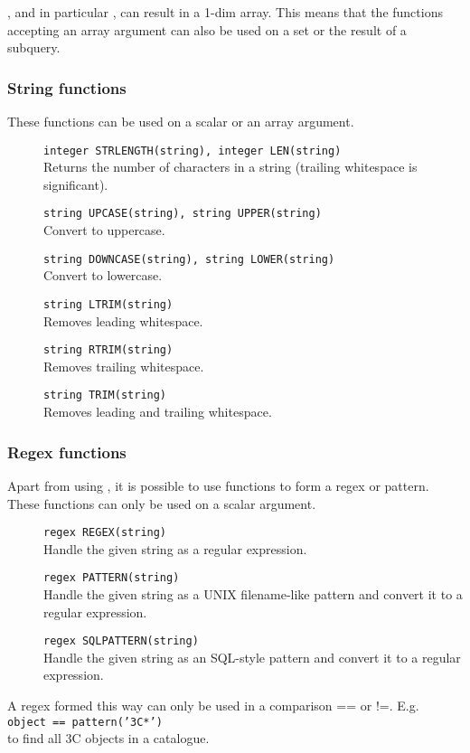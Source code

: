 , and in particular
, can result in a 1-dim array.
This means that the functions accepting an array argument can also
be used on a set or the result of a subquery.

\subsubsection{String functions}
These functions can be used on a scalar or an array argument.
\begin{description}
  \item[] \texttt{integer STRLENGTH(string),  integer LEN(string)}\\
       Returns the number of characters in a string
       (trailing whitespace is significant).
  \item[] \texttt{string UPCASE(string), string UPPER(string) }\\
        Convert to uppercase.
  \item[] \texttt{string DOWNCASE(string),  string LOWER(string)}\\
        Convert to lowercase.
  \item[] \texttt{string LTRIM(string)}\\
       Removes leading whitespace.
  \item[] \texttt{string RTRIM(string)}\\
       Removes trailing whitespace.
  \item[] \texttt{string TRIM(string)}\\
       Removes leading and trailing whitespace.
\end{description}

\subsubsection{Regex functions}
Apart from using ,
it is possible to use functions to form a regex or pattern.
These functions can only be used on a scalar argument.

\begin{description}
  \item[] \texttt{regex REGEX(string)}\\
       Handle the given string as a regular expression.
  \item[] \texttt{regex PATTERN(string)}\\
       Handle the given string as a UNIX filename-like pattern and
       convert it to a regular expression.
  \item[] \texttt{regex SQLPATTERN(string)}\\
       Handle the given string as an SQL-style pattern and
       convert it to a regular expression.
\end{description}
A regex formed this way can only be used in a comparison == or !=. E.g.
\\\texttt{object == pattern('3C*')}
\\to find all 3C objects in a catalogue.

